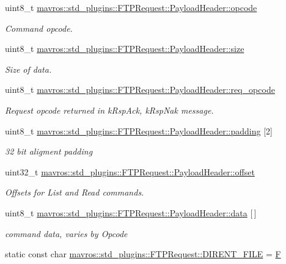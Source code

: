 \begin{DoxyCompactItemize}
uint8\+\_\+t \mbox{\hyperlink{group__plugin_ga340cfea8909b60e37e878965187fc278}{mavros\+::std\+\_\+plugins\+::\+F\+T\+P\+Request\+::\+Payload\+Header\+::opcode}}
\begin{DoxyCompactList}\small\item\em Command opcode. \end{DoxyCompactList}\item 
uint8\+\_\+t \mbox{\hyperlink{group__plugin_gaadeefe030ed0876e8f2d9d5a8b31eec8}{mavros\+::std\+\_\+plugins\+::\+F\+T\+P\+Request\+::\+Payload\+Header\+::size}}
\begin{DoxyCompactList}\small\item\em Size of data. \end{DoxyCompactList}\item 
uint8\+\_\+t \mbox{\hyperlink{group__plugin_gabaad85a3fcad787b3090475a09c9a0d2}{mavros\+::std\+\_\+plugins\+::\+F\+T\+P\+Request\+::\+Payload\+Header\+::req\+\_\+opcode}}
\begin{DoxyCompactList}\small\item\em Request opcode returned in k\+Rsp\+Ack, k\+Rsp\+Nak message. \end{DoxyCompactList}\item 
uint8\+\_\+t \mbox{\hyperlink{group__plugin_ga25e7938240c0066274c19308b8dbbf9a}{mavros\+::std\+\_\+plugins\+::\+F\+T\+P\+Request\+::\+Payload\+Header\+::padding}} \mbox{[}2\mbox{]}
\begin{DoxyCompactList}\small\item\em 32 bit aligment padding \end{DoxyCompactList}\item 
uint32\+\_\+t \mbox{\hyperlink{group__plugin_gad3b592e2842b6992de35f68befe7b068}{mavros\+::std\+\_\+plugins\+::\+F\+T\+P\+Request\+::\+Payload\+Header\+::offset}}
\begin{DoxyCompactList}\small\item\em Offsets for List and Read commands. \end{DoxyCompactList}\item 
uint8\+\_\+t \mbox{\hyperlink{group__plugin_gafd17454ffa66cafc1bf7b4a8d4b82961}{mavros\+::std\+\_\+plugins\+::\+F\+T\+P\+Request\+::\+Payload\+Header\+::data}} \mbox{[}$\,$\mbox{]}
\begin{DoxyCompactList}\small\item\em command data, varies by Opcode \end{DoxyCompactList}\item 
static const char \mbox{\hyperlink{group__plugin_ga305f7ede1a81342461da0e6a5474b530}{mavros\+::std\+\_\+plugins\+::\+F\+T\+P\+Request\+::\+D\+I\+R\+E\+N\+T\+\_\+\+F\+I\+LE}} = \textquotesingle{}\mbox{\hyperlink{mavlink__sha256_8h_a42257a545daf5b7933d6e8f96adc74f2}{F}}\textquotesingle{}

\end{DoxyCompactItemize}
